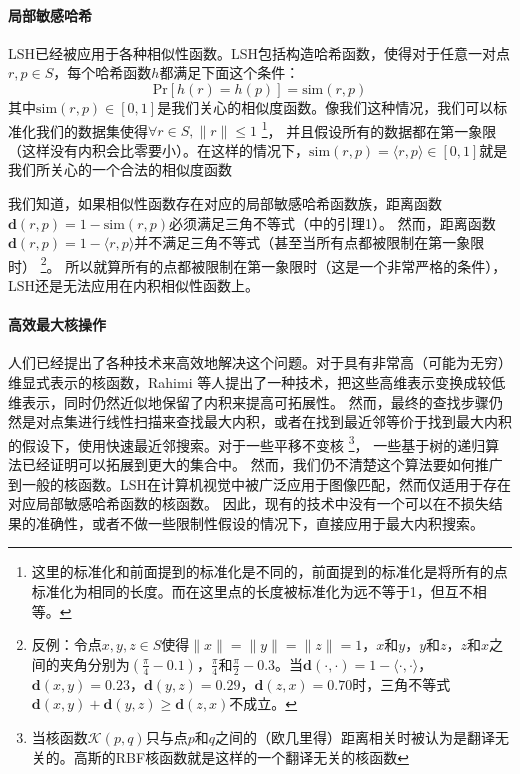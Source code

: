 \documentclass[twocolumn,a4paper]{article}
\begin{document}
\paragraph{局部敏感哈希}LSH已经被应用于各种相似性函数。LSH包括构造哈希函数，使得对于任意一对点$r,p \in S$，每个哈希函数$h$都满足下面这个条件：
\begin{equation}
\mathrm{Pr}[h(r) = h(p)] = \mathrm{sim}(r,p)
\end{equation}
其中$\mathrm{sim}(r,p) \in [0,1]$是我们关心的相似度函数。像我们这种情况，我们可以标准化我们的数据集使得$\forall r \in S, \|r\| \le 1$
\footnote{这里的标准化和前面提到的标准化是不同的，前面提到的标准化是将所有的点标准化为相同的长度。而在这里点的长度被标准化为远不等于1，但互不相等。}，
并且假设所有的数据都在第一象限（这样没有内积会比零要小）。在这样的情况下，$\mathrm{sim}(r,p) = \langle r,p \rangle \in [0,1]$就是我们所关心的一个合法的相似度函数

我们知道，如果相似性函数存在对应的局部敏感哈希函数族，距离函数$\mathbf{d}(r,p) = 1 - \mathrm{sim}(r,p)$必须满足三角不等式（\cite{7}中的引理1）。
然而，距离函数$\mathbf{d}(r, p) = 1 - \langle r,p \rangle$并不满足三角不等式（甚至当所有点都被限制在第一象限时）
\footnote{反例：令点$x,y,z\in S$使得$\|x\|=\|y\|=\|z\|=1$，$x$和$y$，$y$和$z$，$z$和$x$之间的夹角分别为$\left(\frac{\pi}{4} - 0.1\right)$，$\frac{\pi}{4}$和$\frac{\pi}{2} - 0.3$。当$\mathbf{d}(\cdot,\cdot)=1-\langle \cdot,\cdot \rangle$，$\mathbf{d}(x,y) = 0.23$，$\mathbf{d}(y,z)=0.29$，$\mathbf{d}(z,x)=0.70$时，三角不等式$\mathbf{d}(x,y)+\mathbf{d}(y,z)\ge\mathbf{d}(z,x)$不成立。}。
所以就算所有的点都被限制在第一象限时（这是一个非常严格的条件），LSH还是无法应用在内积相似性函数上。

\paragraph{高效最大核操作}人们已经提出了各种技术来高效地解决这个问题。对于具有非常高（可能为无穷）维显式表示的核函数，Rahimi 等人\cite{30}提出了一种技术，把这些高维表示变换成较低维表示，同时仍然近似地保留了内积来提高可拓展性。
然而，最终的查找步骤仍然是对点集进行线性扫描来查找最大内积，或者在找到最近邻等价于找到最大内积的假设下，使用快速最近邻搜索。对于一些平移不变核
\footnote{当核函数$\mathcal{K}(p,q)$只与点$p$和$q$之间的（欧几里得）距离相关时被认为是翻译无关的。高斯的RBF核函数就是这样的一个翻译无关的核函数}，
一些基于树的递归算法已经证明可以拓展到更大的集合中\cite{20}。
然而，我们仍不清楚这个算法要如何推广到一般的核函数。LSH在计算机视觉中被广泛应用于图像匹配\cite{23}，然而仅适用于存在对应局部敏感哈希函数的核函数\cite{7}。
因此，现有的技术中没有一个可以在不损失结果的准确性，或者不做一些限制性假设的情况下，直接应用于最大内积搜索。
\end{document}
